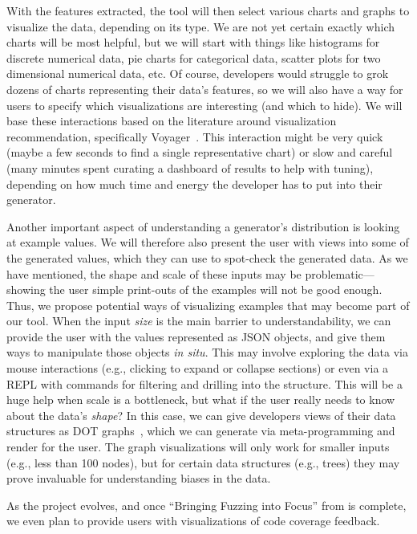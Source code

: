 With the features extracted, the tool will then select various charts and
graphs to visualize the data, depending on its type. We are not yet certain
exactly which charts will be most helpful, but we will start with things like
histograms for discrete numerical data, pie charts for categorical data, scatter
plots for two dimensional numerical data, etc.  Of course, developers would
struggle to grok dozens of charts representing their data's features, so
we will also have a way for users to specify which visualizations are
interesting (and which to hide). We will base these interactions based on the
literature around visualization recommendation, specifically
Voyager~\cite{wongsuphasawat_voyager_2016, wongsuphasawat_voyager_2017}. This
interaction might be very quick (maybe a few seconds to find a single
representative chart) or slow and careful (many minutes spent curating a
dashboard of results to help with tuning), depending on how much time and energy
the developer has to put into their generator.

Another important aspect of understanding a generator's distribution is looking
at example values. We will therefore also present the user with views into some
of the generated values, which they can use to spot-check the generated data. As
we have mentioned, the shape and scale of these inputs may be
problematic---showing the user simple print-outs of the examples will not be
good enough. Thus, we propose potential ways of visualizing examples that may
become part of our tool.
When the input {\em size} is the main barrier to understandability, we can
provide the user with the values represented as JSON objects, and give them ways
to manipulate those objects {\em in situ}.  This may involve exploring the data
via mouse interactions (e.g., clicking to expand or collapse sections) or even
via a REPL with commands for filtering and drilling into the structure. This
will be a huge help when scale is a bottleneck, but what if the user really
needs to know about the data's {\em shape}?
In this case, we can give developers views of their data structures as DOT
graphs~\cite{ellson_graphviz_2002}, which we can generate via
meta-programming and render for the user. The graph visualizations will only
work for smaller inputs (e.g., less than 100 nodes), but for certain data
structures (e.g., trees) they may prove invaluable for understanding biases in
the data.

\iflater
As the project evolves, and once ``Bringing Fuzzing into Focus'' from
 is complete, we even plan to provide users with
visualizations of code coverage feedback.
\fi

